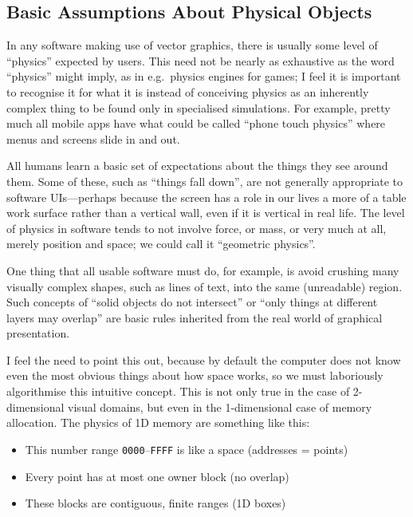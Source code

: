 \hypertarget{basic-assumptions-about-physical-objects}{%
\subsection{Basic Assumptions About Physical
Objects}\label{basic-assumptions-about-physical-objects}}

In any software making use of vector graphics, there is usually some
level of ``physics'' expected by users. This need not be nearly as
exhaustive as the word ``physics'' might imply, as in e.g.~physics
engines for games; I feel it is important to recognise it for what it is
instead of conceiving physics as an inherently complex thing to be found
only in specialised simulations. For example, pretty much all mobile
apps have what could be called ``phone touch physics'' where menus and
screens slide in and out.

All humans learn a basic set of expectations about the things they see
around them. Some of these, such as ``things fall down'', are not
generally appropriate to software UIs---perhaps because the screen has a
role in our lives a more of a table work surface rather than a vertical
wall, even if it is vertical in real life. The level of physics in
software tends to not involve force, or mass, or very much at all,
merely position and space; we could call it ``geometric physics''.

One thing that all usable software must do, for example, is avoid
crushing many visually complex shapes, such as lines of text, into the
same (unreadable) region. Such concepts of ``solid objects do not
intersect'' or ``only things at different layers may overlap'' are basic
rules inherited from the real world of graphical presentation.

I feel the need to point this out, because by default the computer does
not know even the most obvious things about how space works, so we must
laboriously algorithmise this intuitive concept. This is not only true
in the case of 2-dimensional visual domains, but even in the
1-dimensional case of memory allocation. The physics of 1D memory are
something like this:

\begin{itemize}
\tightlist
\item
  This number range \texttt{0000}--\texttt{FFFF} is like a space
  (addresses = points)
\item
  Every point has at most one owner block (no overlap)
\item
  These blocks are contiguous, finite ranges (1D boxes)
\end{itemize}

